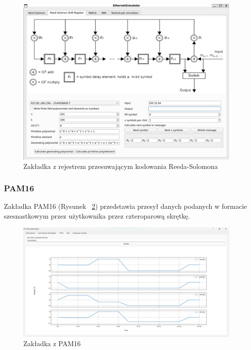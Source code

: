 \begin{figure}[H]
    \centering
    \includegraphics[width=\textwidth]{images/rs-register-tab.png}
    \caption{Zakładka z rejestrem przesuwającym kodowania Reeda-Solomona}
    \label{fig:rs_sr_png}
\end{figure}

\subsubsection{PAM16}

Zakładka PAM16 (Rysunek ~\ref{fig:pam16_sim_png}) przedstawia przesył danych podanych w formacie szesnastkowym przez użytkownika przez czteroparową skrętkę.

\begin{figure}[H]
    \centering
    \includegraphics[width=\textwidth]{images/prezentacja_pam16.png}
    \caption{Zakładka z PAM16}
    \label{fig:pam16_sim_png}
\end{figure}

